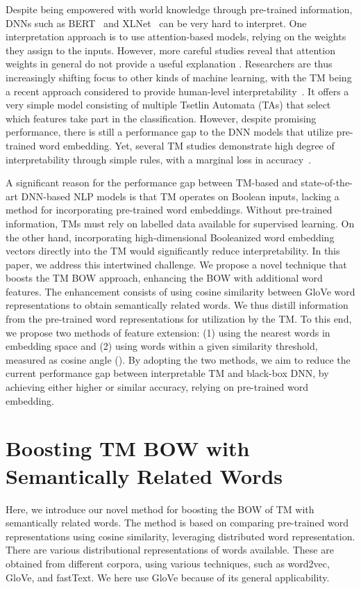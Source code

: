 \documentclass[11pt]{article}
\begin{document}
\par Despite being empowered with world knowledge through pre-trained information, DNNs such as BERT~\cite{devlinbert} and XLNet~\cite{NEURIPS2019_dc6a7e65} can be very hard to interpret. One interpretation approach is to use attention-based models,  relying on the weights they assign to the inputs. However, more careful studies reveal that attention weights in general do not provide a useful explanation \cite{Bai2020WhyIA, serrano-attention}. Researchers are thus increasingly shifting focus to other kinds of machine learning, with the TM being a recent approach considered to provide human-level interpretability~\cite{Berge2019UsingTT, Granmo2018TheTM, yadav2021sentiment}. It offers a very simple model consisting of multiple Tsetlin Automata (TAs) that select which features take part in the classification. However, despite promising performance, there is still a performance gap to the DNN models that utilize pre-trained word embedding. Yet, several TM studies demonstrate high degree of interpretability through simple rules, with a marginal loss in accuracy~\cite{yadav2021sentiment, icaart21rohan, rupsa2020sentiment}.

A significant reason for the performance gap between TM-based and state-of-the-art DNN-based NLP models is that TM operates on Boolean inputs, lacking a method for incorporating pre-trained word embeddings. Without pre-trained information, TMs must rely on labelled data available for supervised learning. On the other hand, incorporating high-dimensional Booleanized word embedding vectors directly into the TM would significantly reduce interpretability. In this paper, we address this intertwined challenge.  We propose a novel technique that boosts the TM BOW approach, enhancing the BOW with additional word features. The enhancement consists of using cosine similarity between GloVe word representations to obtain semantically related words. We thus distill information from the pre-trained word representations for utilization by the TM. To this end, we propose two methods of feature extension: (1) using the  nearest words in embedding space and (2) using words within a given similarity threshold, measured as cosine angle ().  By adopting the two methods, we aim to reduce the current performance gap between interpretable TM and black-box DNN, by achieving either higher or similar accuracy, relying on pre-trained word embedding.


\section{Boosting TM BOW with Semantically Related Words} \label{model}
Here, we introduce our novel method for boosting the BOW of TM with semantically related words. The method is based on comparing pre-trained word representations using cosine similarity, leveraging distributed word representation. There are various distributional representations of words available. These are obtained from different corpora, using various techniques, such as word2vec, GloVe, and fastText. We here use GloVe because of its general applicability.
\end{document}
